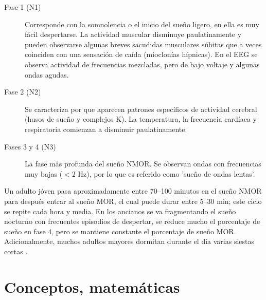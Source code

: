 \documentclass[12pt,a4paper]{mitthesis}
\begin{document}
\begin{description}
\item[Fase 1 (N1)] Corresponde con la somnolencia o el inicio del sue\~no ligero, en ella es muy 
f\'acil despertarse. La actividad muscular disminuye paulatinamente y pueden observarse algunas 
breves sacudidas musculares s\'ubitas que a veces coinciden con una sensación de ca\'ida 
(mioclon\'ias h\'ipnicas). En el EEG se observa actividad de frecuencias mezcladas, pero de bajo 
voltaje y algunas ondas agudas. 

\item[Fase 2 (N2)] Se caracteriza por que aparecen patrones espec\'ificos de actividad 
cerebral (husos de sue\~no y complejos K). La temperatura, la frecuencia card\'iaca y respiratoria 
comienzan a disminuir paulatinamente. 

\item[Fases 3 y 4 (N3)] La fase m\'as profunda del sue\~no NMOR. Se observan ondas con frecuencias 
muy bajas ($<2$ Hz), por lo que es referido como 'sue\~no de ondas lentas'.
\end{description}

Un adulto j\'oven pasa aproximadamente entre 70--100 minutos en el sue\~no NMOR para despu\'es 
entrar al sue\~no MOR, el cual puede durar entre 5--30 min; este ciclo se repite cada hora y media.
En los ancianos se va fragmentando el sue\~no nocturno con frecuentes episodios de despertar, se 
reduce mucho el porcentaje de sue\~no en fase 4, pero se mantiene constante el porcentaje de 
sue\~no MOR. Adicionalmente, muchos adultos mayores dormitan durante el d\'ia varias siestas 
cortas \cite{CarrilloMora}.


\section{Conceptos, matem\'aticas}
\end{document}
